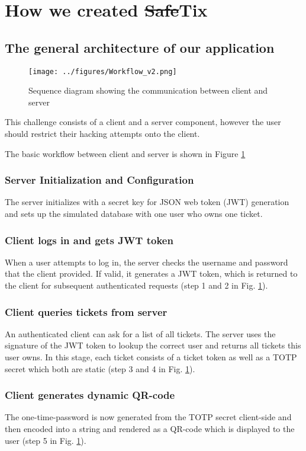 \section{How we created \sout{Safe}Tix}
\subsection{The general architecture of our application}

\begin{figure}[H]
    \centering
    \texttt{[image: ../figures/Workflow\_v2.png]}
    \caption{Sequence diagram showing the communication between client and server}
    \label{fig:WorkFlow2}
\end{figure}

This challenge consists of a client and a server component, however the user should restrict their hacking attempts onto the client.

The basic workflow between client and server is shown in Figure \ref{fig:WorkFlow2}

\subsubsection{Server Initialization and Configuration}
The server initializes with a secret key for JSON web token (JWT) generation and sets up the simulated database with one user who owns one ticket.

\subsubsection{Client logs in and gets JWT token}
When a user attempts to log in, the server checks the username and password that the client provided. If valid, it generates a JWT token, which is returned to the client for subsequent authenticated requests (step 1 and 2 in Fig. \ref{fig:WorkFlow2}).

\subsubsection{Client queries tickets from server}
An authenticated client can ask for a list of all tickets. The server uses the signature of the JWT token to lookup the correct user and returns all tickets this user owns. In this stage, each ticket consists of a ticket token as well as a TOTP secret which both are static (step 3 and 4 in Fig. \ref{fig:WorkFlow2}).

\subsubsection{Client generates dynamic QR-code}
The one-time-password is now generated from the TOTP secret client-side and then encoded into a string and rendered as a QR-code which is displayed to the user (step 5 in Fig. \ref{fig:WorkFlow2}).

